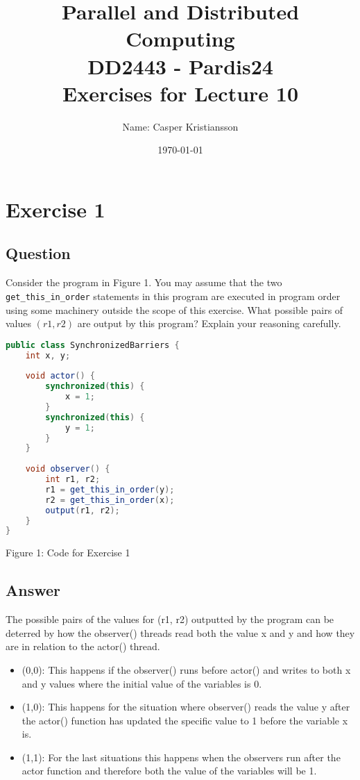 \documentclass{article}
\title{\textbf{Parallel and Distributed Computing\\DD2443 - Pardis24\\Exercises for Lecture 10}}
\author{Name: Casper Kristiansson}
\date{\today}
\begin{document}
\setlength\parindent{0pt}
\setlength{\parskip}{\bigskipamount}

\maketitle

\section*{Exercise 1}
\subsection*{Question}
Consider the program in Figure 1. You may assume that the two \texttt{get\_this\_in\_order} statements in this program are executed in program order using some machinery outside the scope of this exercise. What possible pairs of values $(r1, r2)$ are output by this program? Explain your reasoning carefully.

\begin{lstlisting}[language=Java]
public class SynchronizedBarriers {
    int x, y;
    
    void actor() {
        synchronized(this) {
            x = 1;
        }
        synchronized(this) {
            y = 1;
        }
    }
    
    void observer() {
        int r1, r2;
        r1 = get_this_in_order(y);
        r2 = get_this_in_order(x);
        output(r1, r2);
    }
}
\end{lstlisting}
Figure 1: Code for Exercise 1


\subsection*{Answer}
The possible pairs of the values for (r1, r2) outputted by the program can be deterred by how the observer() threads read both the value x and y and how they are in relation to the actor() thread.

\begin{itemize}
    \item (0,0): This happens if the observer() runs before actor() and writes to both x and y values where the initial value of the variables is 0.
    \item (1,0): This happens for the situation where observer() reads the value y after the actor() function has updated the specific value to 1 before the variable x is.
    \item (1,1): For the last situations this happens when the observers run after the actor function and therefore both the value of the variables will be 1.
\end{itemize}
\end{document}
